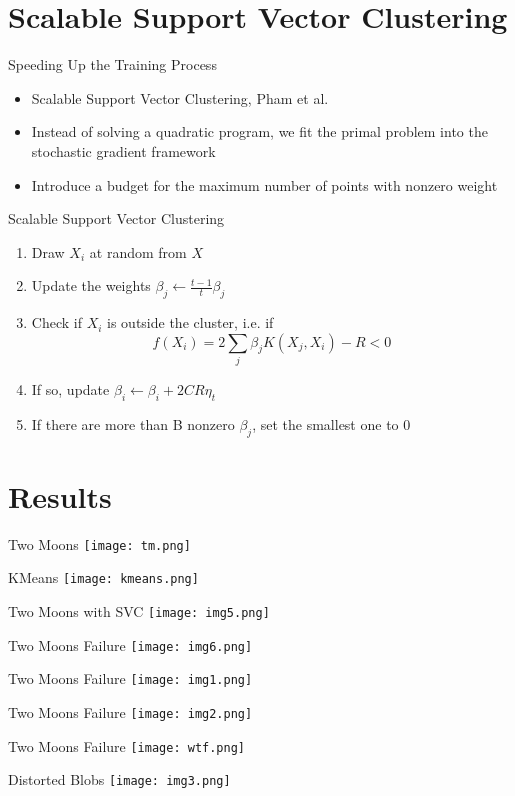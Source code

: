 \documentclass{beamer}
\begin{document}
\section{Scalable Support Vector Clustering}
\begin{frame}{Speeding Up the Training Process}
    \begin{itemize}
        \item Scalable Support Vector Clustering, Pham et al. \cite{ssvc}
        \item Instead of solving a quadratic program, we fit the primal problem into the stochastic gradient framework
        \item Introduce a budget for the maximum number of points with nonzero weight
    \end{itemize}
\end{frame}
\begin{frame}{Scalable Support Vector Clustering}
    \begin{enumerate}
        \item Draw $X_i$ at random from $X$
        \item Update the weights $\beta_j \leftarrow \frac{t-1}{t} \beta_j$
        \item Check if $X_i$ is outside the cluster, i.e. if
        \[
            f(X_i) = 2 \sum_j \beta_j K(X_j, X_i) - R < 0
        \]
        \item If so, update $\beta_i \leftarrow \beta_i + 2 C R \eta_t$
        \item If there are more than B nonzero $\beta_j$, set the smallest one to $0$
    \end{enumerate}
\end{frame}
\section{Results}
\begin{frame}{Two Moons}
\texttt{[image: tm.png]}
\end{frame}
\begin{frame}{KMeans}
\texttt{[image: kmeans.png]}
\end{frame}
\begin{frame}{Two Moons with SVC}
\texttt{[image: img5.png]}
\end{frame}
\begin{frame}{Two Moons Failure}
\texttt{[image: img6.png]}
\end{frame}
\begin{frame}{Two Moons Failure}
\texttt{[image: img1.png]}
\end{frame}
\begin{frame}{Two Moons Failure}
\texttt{[image: img2.png]}
\end{frame}
\begin{frame}{Two Moons Failure}
\texttt{[image: wtf.png]}
\end{frame}
\begin{frame}{Distorted Blobs}
\texttt{[image: img3.png]}
\end{frame}
\end{document}
